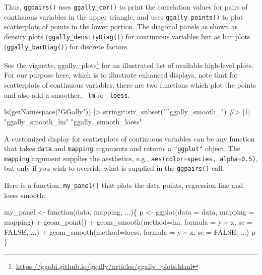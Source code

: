 \documentclass[
  letterpaper,
  10pt,
  krantz2]{krantz}
\makeatletter
\newenvironment{Shaded}{\begin{snugshade}}{\end{snugshade}}
\newcommand{\AttributeTok}[1]{\textcolor[rgb]{0.40,0.45,0.13}{#1}}
\newcommand{\CommentTok}[1]{\textcolor[rgb]{0.37,0.37,0.37}{#1}}
\newcommand{\ConstantTok}[1]{\textcolor[rgb]{0.56,0.35,0.01}{#1}}
\newcommand{\ControlFlowTok}[1]{\textcolor[rgb]{0.00,0.23,0.31}{#1}}
\newcommand{\FunctionTok}[1]{\textcolor[rgb]{0.28,0.35,0.67}{#1}}
\newcommand{\NormalTok}[1]{\textcolor[rgb]{0.00,0.23,0.31}{#1}}
\newcommand{\OtherTok}[1]{\textcolor[rgb]{0.00,0.23,0.31}{#1}}
\newcommand{\SpecialCharTok}[1]{\textcolor[rgb]{0.37,0.37,0.37}{#1}}
\newcommand{\StringTok}[1]{\textcolor[rgb]{0.13,0.47,0.30}{#1}}
\providecommand{\href}[2]{#2\footnote{\url{#1}}}
\newenvironment{kframe}{%
  \medskip{}
  \setlength{\fboxsep}{.8em}
  \def\at@end@of@kframe{}%
  \ifinner\ifhmode%
  \def\at@end@of@kframe{\end{minipage}}%
  \begin{minipage}{\columnwidth}%
  \fi\fi%
  \def\FrameCommand##1{\hskip\@totalleftmargin \hskip-\fboxsep
  \colorbox{shadecolor}{##1}\hskip-\fboxsep
      \hskip-\linewidth \hskip-\@totalleftmargin \hskip\columnwidth}%
  \MakeFramed {\advance\hsize-\width
    \@totalleftmargin\z@ \linewidth\hsize
    \@setminipage}}%
{\par\unskip\endMakeFramed%
  \at@end@of@kframe}
\renewenvironment{Shaded}{\begin{kframe}}{\end{kframe}}
\makeatother
\begin{document}
Thus, \texttt{ggpairs()} uses \texttt{ggally\_cor()} to print the
correlation values for pairs of continuous variables in the upper
triangle, and uses \texttt{ggally\_points()} to plot scatterplots of
points in the lower portion. The diagonal panels as shown as density
plots (\texttt{ggally\_densityDiag()}) for continuous variables but as
bar plots (\texttt{ggally\_barDiag()}) for discrete factors.

See the vignette,
\href{https://ggobi.github.io/ggally/articles/ggally_plots.html}{ggally\_plots}
for an illustrated list of available high-level plots. For our purpose
here, which is to illustrate enhanced displays, note that for
scatterplots of continuous variables, there are two functions which plot
the points and also add a smoother, \texttt{\_lm} or \texttt{\_loess}.

\begin{Shaded}
\begin{Highlighting}[]
\FunctionTok{ls}\NormalTok{(}\FunctionTok{getNamespace}\NormalTok{(}\StringTok{"GGally"}\NormalTok{)) }\SpecialCharTok{|\textgreater{}}\NormalTok{ stringr}\SpecialCharTok{::}\FunctionTok{str\_subset}\NormalTok{(}\StringTok{"\^{}ggally\_smooth\_"}\NormalTok{)}
\CommentTok{\#\textgreater{} [1] "ggally\_smooth\_lm"    "ggally\_smooth\_loess"}
\end{Highlighting}
\end{Shaded}

A customized display for scatterplots of continuous variables can be any
function that takes \texttt{data} and \texttt{mapping} arguments and
returns a \texttt{"ggplot"} object. The \texttt{mapping} argument
supplies the aesthetics, e.g., \texttt{aes(color=species,\ alpha=0.5)},
but only if you wish to override what is supplied in the
\texttt{ggpairs()} call.

Here is a function, \texttt{my\_panel()} that plots the data points,
regression line and loess smooth:

\begin{Shaded}
\begin{Highlighting}[]
\NormalTok{my\_panel }\OtherTok{\textless{}{-}} \ControlFlowTok{function}\NormalTok{(data, mapping, ...)\{}
\NormalTok{  p }\OtherTok{\textless{}{-}} \FunctionTok{ggplot}\NormalTok{(}\AttributeTok{data =}\NormalTok{ data, }\AttributeTok{mapping =}\NormalTok{ mapping) }\SpecialCharTok{+} 
    \FunctionTok{geom\_point}\NormalTok{() }\SpecialCharTok{+} 
    \FunctionTok{geom\_smooth}\NormalTok{(}\AttributeTok{method=}\NormalTok{lm, }\AttributeTok{formula =}\NormalTok{ y }\SpecialCharTok{\textasciitilde{}}\NormalTok{ x, }\AttributeTok{se =} \ConstantTok{FALSE}\NormalTok{, ...) }\SpecialCharTok{+}
    \FunctionTok{geom\_smooth}\NormalTok{(}\AttributeTok{method=}\NormalTok{loess, }\AttributeTok{formula =}\NormalTok{ y }\SpecialCharTok{\textasciitilde{}}\NormalTok{ x, }\AttributeTok{se =} \ConstantTok{FALSE}\NormalTok{, ...)}
\NormalTok{  p}
\NormalTok{\}}
\end{Highlighting}
\end{Shaded}
\end{document}
